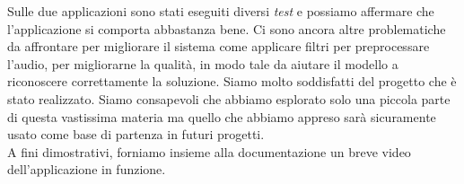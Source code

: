 Sulle due applicazioni sono stati eseguiti diversi \textit{test} e possiamo affermare che l'applicazione si comporta abbastanza bene.
Ci sono ancora altre problematiche da affrontare per migliorare il sistema come applicare filtri per preprocessare l'audio, per migliorarne la qualità, in modo tale da aiutare il modello a riconoscere correttamente la soluzione.
Siamo molto soddisfatti del progetto che è stato realizzato. Siamo consapevoli che abbiamo esplorato solo una piccola parte di questa vastissima materia ma quello che abbiamo appreso sarà sicuramente usato come base di partenza in futuri progetti.\\
\newline
A fini dimostrativi, forniamo insieme alla documentazione un breve video dell'applicazione in funzione.